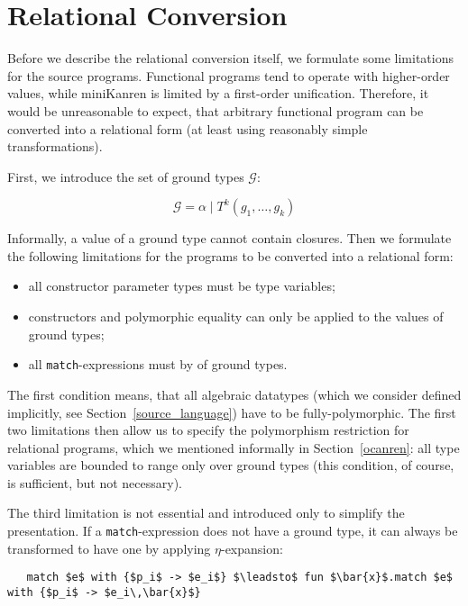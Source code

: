 \section{Relational Conversion}
\label{conversion}
\def\arraystretch{1}

Before we describe the relational conversion itself, we formulate some limitations for the source
programs. Functional programs tend to operate with higher-order values, while miniKanren is
limited by a first-order unification. Therefore, it would be unreasonable to expect, that arbitrary
functional program can be converted into a relational form (at least using reasonably simple 
transformations). 

First, we introduce the set of ground types $\mathcal G$:

$$
\mathcal G=\alpha \mid T^k(g_1,\dots,g_k)
$$

Informally, a value of a ground type cannot contain closures. Then we formulate the following limitations for
the programs to be converted into a relational form:

\begin{itemize}
  \item all constructor parameter types must be type variables;
  \item constructors and polymorphic equality can only be applied to the values of ground types;
  \item all \lstinline|match|-expressions must by of ground types.
\end{itemize}

The first condition means, that all algebraic datatypes (which we consider defined implicitly, see Section~\ref{source_language}) 
have to be fully-polymorphic. The first two limitations then allow us to specify the polymorphism restriction for 
relational programs, which we mentioned informally in Section~\ref{ocanren}: all type variables are bounded to
range only over ground types (this condition, of course, is sufficient, but not necessary).

The third limitation is not essential and introduced only to simplify the presentation. If a \lstinline|match|-expression does not
have a ground type, it can always be transformed to have one by applying $\eta$-expansion:

\begin{lstlisting}
   match $e$ with {$p_i$ -> $e_i$} $\leadsto$ fun $\bar{x}$.match $e$ with {$p_i$ -> $e_i\,\bar{x}$}
\end{lstlisting}

